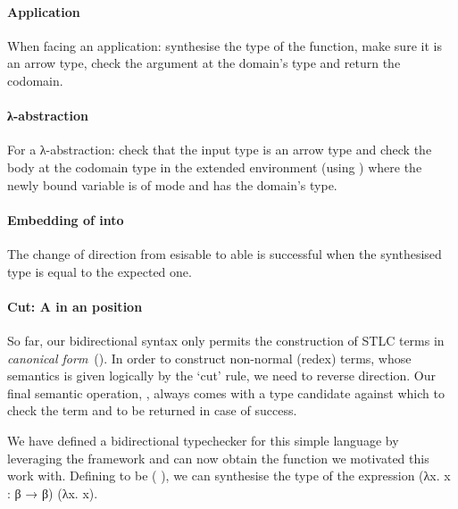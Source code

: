 \paragraph{Application} When facing an application: synthesise the type of the
function, make sure it is an arrow type, check the argument at the domain's
type and return the codomain.
\begin{agdasnippet}
\end{agdasnippet}
%
\paragraph{λ-abstraction} For a λ-abstraction: check that the input
type  is an arrow type and check the body  at the
codomain type in the extended environment (using ) where the
newly bound variable is of mode  and has the domain's type.
\begin{agdasnippet}
\end{agdasnippet}
%
\paragraph{Embedding of  into } The change of
direction from esisable to able is successful when the
synthesised type is equal to the expected one.
\begin{agdasnippet}
\end{agdasnippet}
%
\paragraph{Cut: A  in an  position}
So far, our bidirectional syntax only permits the construction
  of STLC terms in \emph{canonical
    form}~(\cite{Pfenning:04,Dunfield:2004:TT:964001.964025}).
  In order to construct
  non-normal (redex) terms, whose semantics is given logically by the
  `cut' rule, we need to reverse direction.
Our final semantic operation, ,
always comes with a type candidate against which to check the term and
to be returned in case of success.
\begin{agdasnippet}
\end{agdasnippet}
%
We have defined a bidirectional typechecker for this simple language by
leveraging the \semrec{} framework and can now obtain the 
function we motivated this work with.
Defining  to be {(  )}, we can synthesise the
type of the expression {(λx. x : β → β) (λx. x)}.

